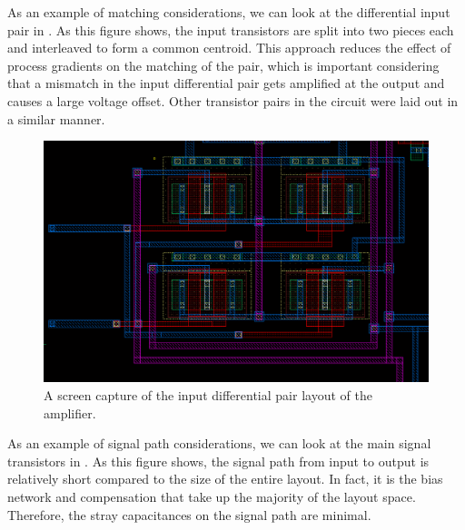\documentclass[journal,hidelinks]{IEEEtran}
\begin{document}
As an example of matching considerations, we can look at the differential input pair in . As this figure shows, the input transistors are split into two pieces each and interleaved to form a common centroid. This approach reduces the effect of process gradients on the matching of the pair, which is important considering that a mismatch in the input differential pair gets amplified at the output and causes a large voltage offset. Other transistor pairs in the circuit were laid out in a similar manner.

\begin{figure}[!htb]
  \centering
  \includegraphics[width=\columnwidth]{images/diff-pair.png}
  \caption{A screen capture of the input differential pair layout of the amplifier.}
  \label{fig:diff-pair}
\end{figure}

As an example of signal path considerations, we can look at the main signal transistors in . As this figure shows, the signal path from input to output is relatively short compared to the size of the entire layout. In fact, it is the bias network and compensation that take up the majority of the layout space. Therefore, the stray capacitances on the signal path are minimal.
\end{document}
